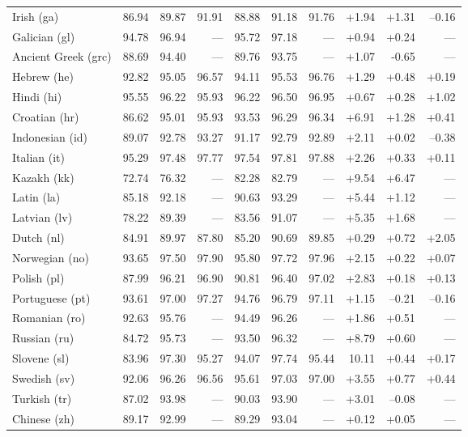 \documentclass[11pt,letterpaper]{article}
\begin{document}
\begin{table}[t]
\begin{tabular}{l|rrr|rrr|rrr}
Irish (ga) & 86.94 & 89.87 & 91.91 & 88.88 & 91.18 & 91.76 & +1.94 & +1.31 & --0.16\\
Galician (gl) & 94.78 & 96.94 & --- & 95.72 & 97.18 & --- & +0.94 & +0.24 & ---\\
Ancient Greek (grc) & 88.69 & 94.40 & --- & 89.76 & 93.75 & --- & +1.07 & -0.65 & ---\\
Hebrew (he) & 92.82 & 95.05 & 96.57 & 94.11 & 95.53 & 96.76 & +1.29 & +0.48 & +0.19\\
Hindi (hi) & 95.55 & 96.22 & 95.93 & 96.22 & 96.50 & 96.95 & +0.67 & +0.28 & +1.02\\
Croatian (hr) & 86.62 & 95.01 & 95.93 & 93.53 & 96.29 & 96.34 & +6.91 & +1.28 & +0.41\\
Indonesian (id) & 89.07 & 92.78 & 93.27 & 91.17 & 92.79 & 92.89 & +2.11 & +0.02 & --0.38\\
Italian (it) & 95.29 & 97.48 & 97.77 & 97.54 & 97.81 & 97.88 & +2.26 & +0.33 & +0.11\\
Kazakh (kk) & 72.74 & 76.32 & --- & 82.28 & 82.79 & --- & +9.54 & +6.47 & ---\\
Latin (la) & 85.18 & 92.18 & --- & 90.63 & 93.29 & --- & +5.44 & +1.12 & ---\\
Latvian (lv) & 78.22 & 89.39 & --- & 83.56 & 91.07 & --- & +5.35 & +1.68 & ---\\
Dutch (nl) & 84.91 & 89.97 & 87.80 & 85.20 & 90.69 & 89.85 & +0.29 & +0.72 & +2.05\\
Norwegian (no) & 93.65 & 97.50 & 97.90 & 95.80 & 97.72 & 97.96 & +2.15 & +0.22 & +0.07\\
Polish (pl) & 87.99 & 96.21 & 96.90 & 90.81 & 96.40 & 97.02 & +2.83 & +0.18 & +0.13\\
Portuguese (pt) & 93.61 & 97.00 & 97.27 & 94.76 & 96.79 & 97.11 & +1.15 & --0.21 & --0.16\\
Romanian (ro) & 92.63 & 95.76 & --- & 94.49 & 96.26 & --- & +1.86 & +0.51 & ---\\
Russian (ru) & 84.72 & 95.73 & --- & 93.50 & 96.32 & --- & +8.79 & +0.60 & ---\\
Slovene (sl) & 83.96 & 97.30 & 95.27 & 94.07 & 97.74 & 95.44 & 10.11 & +0.44 & +0.17\\
Swedish (sv) & 92.06 & 96.26 & 96.56 & 95.61 & 97.03 & 97.00 & +3.55 & +0.77 & +0.44\\
Turkish (tr) & 87.02 & 93.98 & --- & 90.03 & 93.90 & --- & +3.01 & --0.08 & ---\\
Chinese (zh) & 89.17 & 92.99 & --- & 89.29 & 93.04 & --- & +0.12 & +0.05 & ---\\

\end{tabular}
\end{table}
\end{document}
